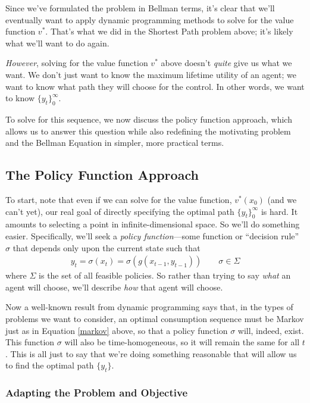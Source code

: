 \documentclass[a4paper,12pt]{scrartcl}
\begin{document}
Since we've formulated the problem in Bellman terms, it's
clear that we'll eventually want to apply dynamic
programming methods to solve for the value function $v^*$.
That's what we did in the Shortest Path problem above; it's
likely what we'll want to do again.  


\emph{However}, solving for the value function $v^*$ above
doesn't \emph{quite} give us what we want. We don't just
want to know the maximum lifetime utility of an agent; we
want to know what path they will choose for the control.
In other words, we want to know $\{y_t\}_0^\infty$. 

To solve for this sequence, we now discuss the policy function approach,
which allows us to answer this question while also redefining the
motivating problem and the Bellman Equation in simpler, more practical
terms. 


\subsection{The Policy Function Approach}

To start, note that even if we can solve for the value function,
$v^*(x_0)$ (and we can't yet), our real goal of directly specifying the
optimal path $\{y_t\}_0^\infty$ is hard. It amounts to selecting a point
in infinite-dimensional space.  So we'll do something easier.
Specifically, we'll seek a \emph{policy function}---some function or
``decision rule'' $\sigma$ that depends only upon the current state such
that 
\begin{align}
  \label{markov}
  y_t = \sigma(x_t) = \sigma(g(x_{t-1}, y_{t-1}))
  \qquad \sigma \in \Sigma
\end{align}
where $\Sigma$ is the set of all feasible policies. So rather than
trying to say \emph{what} an agent will choose, we'll describe
\emph{how} that agent will choose.

Now a well-known result from dynamic programming says that, in the types
of problems we want to consider, an optimal consumption sequence must be
Markov just as in Equation \ref{markov} above, so that a policy function
$\sigma$ will, indeed, exist.  This function $\sigma$ will also be
time-homogeneous, so it will remain the same for all $t$.  This is all
just to say that we're doing something reasonable that will allow us to
find the optimal path $\{y_t\}$.

\subsubsection{Adapting the Problem and Objective}
\end{document}
